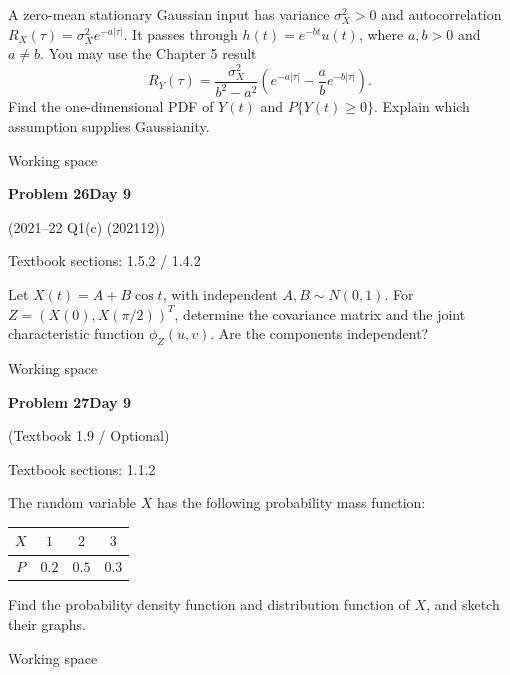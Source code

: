 \documentclass[11pt]{article}
\newcommand{\qtitle}[2]{\clearpage\begin{tcolorbox}[colback=navy,colframe=navy,arc=1.5pt,boxrule=0pt]\color{white}\large\bfseries #1\hfill\small #2\end{tcolorbox}}
\begin{document}
\begin{tcolorbox}[colback=qbg,colframe=qbg,boxrule=0pt]A zero-mean stationary Gaussian input has variance $\sigma_X^2>0$ and autocorrelation $R_X(\tau)=\sigma_X^2e^{-a|\tau|}$. It passes through $h(t)=e^{-bt}u(t)$, where $a,b>0$ and $a\ne b$. You may use the Chapter 5 result
\[R_Y(\tau)=\frac{\sigma_X^2}{b^2-a^2}\left(e^{-a|\tau|}-\frac ab e^{-b|\tau|}\right).\]
Find the one-dimensional PDF of $Y(t)$ and $P\{Y(t)\ge0\}$. Explain which assumption supplies Gaussianity.\end{tcolorbox}\smallskip\begin{workspace}\hfill{\color{linec}\footnotesize Working space}\end{workspace}
\qtitle{Problem 26}{Day 9}
{\small\color{accentred}(2021--22 Q1(c) (202112))}\par\smallskip
{\small\color{muted}Textbook sections: 1.5.2 / 1.4.2}\par\medskip
\begin{tcolorbox}[colback=qbg,colframe=qbg,boxrule=0pt]Let $X(t)=A+B\cos t$, with independent $A,B\sim N(0,1)$. For $Z=(X(0),X(\pi/2))^T$, determine the covariance matrix and the joint characteristic function $\phi_Z(u,v)$. Are the components independent?\end{tcolorbox}\smallskip\begin{workspace}\hfill{\color{linec}\footnotesize Working space}\end{workspace}
\qtitle{Problem 27}{Day 9}
{\small\color{accentred}(Textbook 1.9 / Optional)}\par\smallskip
{\small\color{muted}Textbook sections: 1.1.2}\par\medskip
\begin{tcolorbox}[colback=qbg,colframe=qbg,boxrule=0pt]The random variable $X$ has the following probability mass function:
\begin{center}
\renewcommand{\arraystretch}{1.35}
\begin{tabular}{c|ccc}
\toprule
$X$ & $1$ & $2$ & $3$ \\
\midrule
$P$ & $0.2$ & $0.5$ & $0.3$ \\
\bottomrule
\end{tabular}
\end{center}
Find the probability density function and distribution function of $X$, and sketch their graphs.\end{tcolorbox}\smallskip\begin{workspace}\hfill{\color{linec}\footnotesize Working space}\end{workspace}
\end{document}
